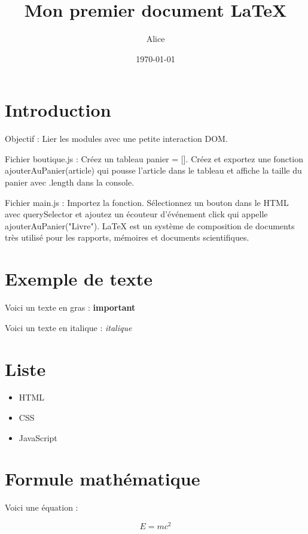 \documentclass{article}
\title{Mon premier document LaTeX}
\author{Alice}
\date{\today}
\begin{document}
\maketitle

\section{Introduction}
Objectif : Lier les modules avec une petite interaction DOM.

Fichier boutique.js : Créez un tableau panier = []. Créez et exportez une fonction ajouterAuPanier(article) qui pousse l'article dans le tableau et affiche la taille du panier avec .length dans la console.

Fichier main.js : Importez la fonction. Sélectionnez un bouton dans le HTML avec querySelector et ajoutez un écouteur d'événement click qui appelle ajouterAuPanier("Livre").
LaTeX est un système de composition de documents très utilisé pour les rapports, mémoires et documents scientifiques.

\section{Exemple de texte}

Voici un texte en gras : \textbf{important}

Voici un texte en italique : \textit{italique}

\section{Liste}

\begin{itemize}
    \item HTML
    \item CSS
    \item JavaScript
\end{itemize}

\section{Formule mathématique}

Voici une équation :

\[
E = mc^2
\]
\end{document}
